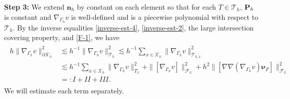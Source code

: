 \documentclass[10pt, a4paper]{amsart}
\newcommand{\bn}{{\bm n}}
\newcommand{\p}{\partial}
\newcommand{\nab}{\nabla}
\newcommand{\calT}{\mathcal{T}}
\newcommand{\calF}{\mathcal{F}}
\newcommand{\calK}{\mathcal{K}}
\newcommand{\calX}{\mathcal{X}}
\newcommand{\Grad}{\nabla\!\!\!\!\nabla}
\newcommand{\bnu}{{\bm \nu}}
\theoremstyle{definition}
\theoremstyle{remark}
\theoremstyle{example}
\numberwithin{equation}{section}
\begin{document}
{\bf Step 3:}
We extend $\bn_h$ by constant on each element
so that for each $T \in \calT_h$, ${\bf P}_{h}$ is constant and $\nab_{\Gamma_h}v$ is well-defined and is a piecewise polynomial with respect to $\calT_h$. By the inverse equalities \eqref{inverse-est-4}, \eqref{inverse-est-2}, the large intersection covering property, and \eqref{F-1}, we have
\begin{align}
\begin{split} \label{251110-3}
h\|\nab_{\Gamma_h}v\|_{\p\calK_h}^2
& \lesssim h^{-1}\|\nab_{\Gamma_h}v\|_{\calT_h}^2
\lesssim h^{-1}\sum_{x \in \calX_h}\|\nab_{\Gamma_h}v\|_{\calT_{h,x}}^2 \\
& \lesssim h^{-1}\sum_{x \in \calX_h}\|\nab_{\Gamma_h}v\|_{T_x}^2 + \|[\nab_{\Gamma_h}v]\|_{\calF_h}^2 + h^2\|[\Grad(\nab_{\Gamma_h}v)\bnu_F]\|_{\calF_h}^2 \\
& =: I + II + III.
\end{split}
\end{align}
We will estimate each term separately.
\end{document}

